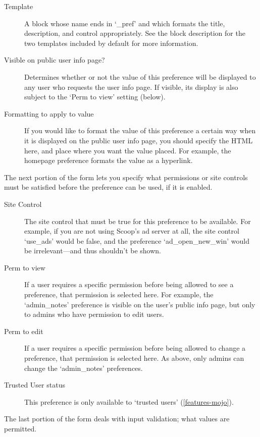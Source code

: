 \begin{description}
\item[Template] A block whose name ends in `\_pref' and which formats the title, description, and control appropriately. See the block description for the two templates included by default for more information.
\item[Visible on public user info page?] Determines whether or not the value of this preference will be displayed to any user who requests the user info page. If visible, its display is also subject to the `Perm to view' setting (below).
\item[Formatting to apply to value] If you would like to format the value of this preference a certain way when it is displayed on the public user info page, you should specify the HTML here, and place  where you want the value placed. For example, the homepage preference formats the value as a hyperlink.
\end{description}

The next portion of the form lets you specify what permissions or site controls must be satisfied before the preference can be used, if it is enabled.

\begin{description}
\item[Site Control] The site control that must be true for this preference to be available. For example, if you are not using Scoop's ad server at all, the site control `use\_ads' would be false, and the preference `ad\_open\_new\_win' would be irrelevant---and thus shouldn't be shown.
\item[Perm to view] If a user requires a specific permission before being allowed to see a preference, that permission is selected here. For example, the `admin\_notes' preference is visible on the user's public info page, but only to admins who have permission to edit users.
\item[Perm to edit] If a user requires a specific permission before being allowed to change a preference, that permission is selected here. As above, only admins can change the `admin\_notes' preferences.
\item[Trusted User status] This preference is only available to `trusted users' (\ref{features-mojo}).
\end{description}

The last portion of the form deals with input validation; what values are permitted.

